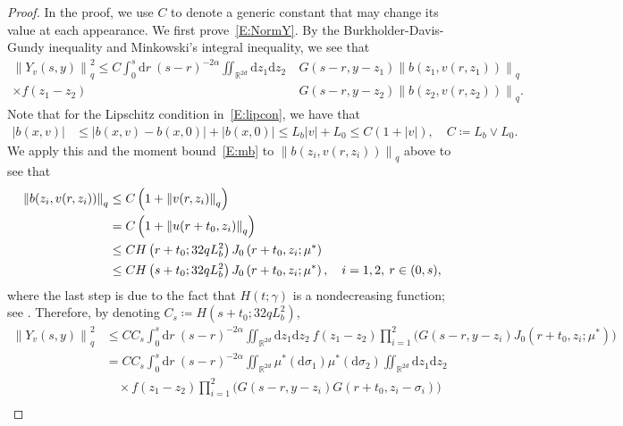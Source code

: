 \documentclass[a4paper,11pt]{article}%
\theoremstyle{plain}
\theoremstyle{definition}
\numberwithin{equation}{section}
\newcommand{\R}{\mathbb{R}}
\newcommand{\Norm}[1]{\left\| #1 \right\|}
\newcommand{\ud}{\ensuremath{\mathrm{d}}}
\begin{document}
\begin{proof}
  In the proof, we use $C$ to denote a generic constant that may change its value at each
  appearance. We first prove~\eqref{E:NormY}. By the Burkholder-Davis-Gundy inequality and
  Minkowski's integral inequality, we see that
  \begin{align*}
    \Norm{Y_v(s,y)}_q^2 \le
    C \int_0^s \ud r \: (s-r)^{-2\alpha}
    \iint_{\R^{2d}} \ud z_1\ud z_2 \: & G(s-r,y-z_1) \Norm{b\left(z_1,v(r,z_1)\right)}_q \\
    \times f(z_1-z_2)                 & G(s-r,y-z_2) \Norm{b\left(z_2,v(r,z_2)\right)}_q.
  \end{align*}
  Note that for the Lipschitz condition in~\eqref{E:lipcon}, we have that
  \begin{align*}
    \left|b\left(x,v\right)\right|
    & \le \left|b\left(x,v\right) - b\left(x,0\right)\right| + \left|b\left(x,0\right)\right|
    \le L_b |v| + L_0 \le C (1+|v|),\quad C\coloneqq L_b\vee L_0.
  \end{align*}
  We apply this and the moment bound~\eqref{E:mb} to $\Norm{b(z_i, v(r,z_i))}_q$ above to see that
  \begin{align}\label{E:NormB}
    \Norm{b(z_i, v(r,z_i))}_q
    & \le C\left(1+\Norm{v(r,z_i)}_q\right)                               \notag \\
    & =   C\left(1+\Norm{u(r+t_0,z_i)}_q\right)                           \notag \\
    & \le C H\left(r+t_0;32qL_b^2\right) J_0\left(r + t_0,z_i;\mu^*\right)\notag \\
    & \le C H\left(s+t_0;32qL_b^2\right) J_0\left(r + t_0,z_i;\mu^*\right), \quad i = 1,2, \: r\in(0,s),
  \end{align}
  where the last step is due to the fact that $H(t;\gamma)$ is a nondecreasing function; see 
  \cite[Lemma 2.6]{chen.kim:19:nonlinear}. Therefore, by denoting $C_s \coloneqq
  H\left(s+t_0;32qL_b^2\right)$,
  \begin{align*}
    \Norm{Y_v(s,y)}_q^2
    & \le C C_s \int_0^s \ud r \: (s-r)^{-2\alpha} \iint_{\R^{2d}} \ud z_1\ud z_2\: f(z_1-z_2) \prod_{i = 1}^2 \bigg(G(s-r,y-z_i) J_0\left(r + t_0,z_i;\mu^*\right)\bigg)      \\
    & = C C_s \int_0^s \ud r \: (s-r)^{-2\alpha} \iint_{\R^{2d}} \mu^* (\ud \sigma_1) \mu^* (\ud \sigma_2) \iint_{\R^{2d}} \ud z_1\ud z_2                                      \\
    & \quad \times f(z_1-z_2) \prod_{i = 1}^{2} \bigg(G(s-r,y-z_i)G(r + t_0,z_i-\sigma_i) \bigg)                                                                               \\

\end{align*}
\end{proof}
\end{document}
